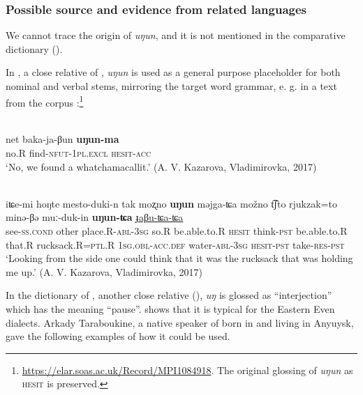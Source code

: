 \documentclass[output=paper,colorlinks,citecolor=brown]{langscibook}
\begin{document}
\subsubsection{Possible source and evidence from related languages}

We cannot trace the origin of \textit{uŋun}, and it is not mentioned in the comparative dictionary (\citealt{Cincius1975K}).

In , a close relative of , \textit{uŋun} is used as a general purpose placeholder for both nominal and verbal stems, mirroring the target word grammar, e. g. in a text from the  corpus \citep{Pakendorf2017}:\footnote{\url{https://elar.soas.ac.uk/Record/MPI1084918}. The original glossing of \textit{uŋun} as \textsc{hesit} is preserved.}

\ea
    \label{example6.40}
    \\
    \gll net	baka-ja-βun	\textbf{uŋun-ma}\\
    no.R	find-\textsc{nfut}-1\textsc{pl.excl}	\textsc{hesit}-\textsc{acc}\\
    \glt `No, we found a whatchamacallit.' (A. V. Kazarova, Vladimirovka, 2017)\\
    \z


\ea
    \label{example6.41}
    \\
    \gll iʨe-mi	hoŋte	mesto-duki-n	tak	   moʐno	\textbf{uŋun}	məjga-ʨa	možno   t͡ʃto	rjukzak=to	minə-βə 	muː-duk-in  \textbf{uŋun-ʨa}	\uline{ɟaβu-ʨa-ʨa}\\
    see-\textsc{ss.cond}	other	place.R-\textsc{abl}-3\textsc{sg}	so.R    be.able.to.R	\textsc{hesit}	think-\textsc{pst}	be.able.to.R    that.R	rucksack.R=\textsc{ptl}.R	1\textsc{sg.obl}-\textsc{acc}.\textsc{def}	water-\textsc{abl}-3\textsc{sg}  \textsc{hesit}-\textsc{pst}	take-\textsc{res}-\textsc{pst}\\
    \glt `Looking from the side one could think that it was the rucksack that was holding me up.' (A. V. Kazarova, Vladimirovka, 2017)\\
    \z

In the dictionary of , another close relative (\citealt[271]{Robbek2005}), \textit{uŋ} is glossed as “interjection” which has the meaning “pause”. \citet{Matić2008} shows that it is typical for the Eastern Even dialects. Arkady Taraboukine, a native speaker of  born in  and living in Anyuysk, gave the following examples of how it could be used.
\end{document}
